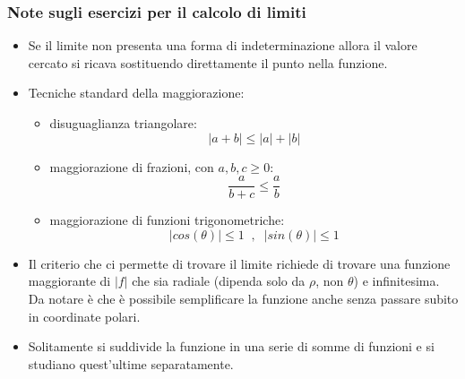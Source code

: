 \subsubsection{Note sugli esercizi per il calcolo di limiti}
\begin{itemize}
    \item Se il limite non presenta una forma di indeterminazione allora il valore cercato si ricava sostituendo direttamente il punto nella funzione.
    \item Tecniche standard della maggiorazione: 
        \begin{itemize}
            \item disuguaglianza triangolare:
                \[
                    |a+b| \leq |a| + |b|
                \]
            \item maggiorazione di frazioni, con $a,b,c \geq 0$:
                \[
                    \frac{a}{b+c} \leq \frac{a}{b}
                \]
            \item maggiorazione di funzioni trigonometriche:
                \[
                    |cos(\theta)| \leq 1 \;\;,\;\;|sin(\theta)|\leq 1
                \]
        \end{itemize}
    \item Il criterio che ci permette di trovare il limite richiede di trovare una funzione maggiorante di $|f|$ che sia radiale (dipenda solo da $\rho$, non $\theta$) e infinitesima. Da notare è che è possibile semplificare la funzione anche senza passare subito in coordinate polari.
    \item Solitamente si suddivide la funzione in una serie di somme di funzioni e si studiano quest'ultime separatamente.
\end{itemize}
